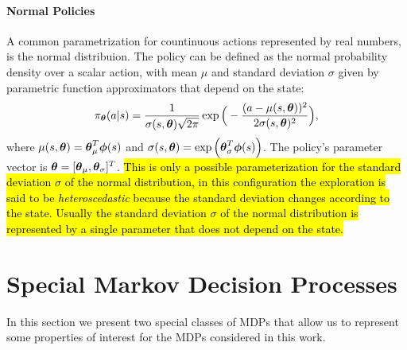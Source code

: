 \paragraph{Normal Policies}
A common parametrization for countinuous actions represented by real numbers, is the normal distribuion. The policy can be defined as the normal probability density over a scalar action, with mean $\mu$ and standard deviation $\sigma$ given by parametric function approximators that depend on the state:
\begin{align} \pi_{\boldsymbol{\theta}}(a|s) = \frac{1}{\sigma(s, \boldsymbol{\theta})\sqrt{2\pi}}\exp\Big( -\frac{(a -\mu(s, \boldsymbol{\theta}))^2}{2\sigma(s, \boldsymbol{\theta})^2}\Big), \end{align}
where $\mu(s, \boldsymbol{\theta}) = \boldsymbol{\theta}_{\mu}^{T} \boldsymbol{\phi}(s)$ and $\sigma(s, \boldsymbol{\theta}) = \exp\Big( \boldsymbol{\theta}_{\sigma}^{T}\boldsymbol{\phi}(s) \Big)$. The policy's parameter vector is $\boldsymbol{\theta} = [\boldsymbol{\theta}_{\mu}, \boldsymbol{\theta}_{\sigma}]^{T}$. \hl{This is only a possible parameterization for the standard deviation $\sigma$ of the normal distribution, in this configuration the exploration is said to be \emph{heteroscedastic} because the standard deviation changes according to the state. Usually the standard deviation $\sigma$ of the normal distribution is represented by a single parameter that does not depend on the state.} 

\section{Special Markov Decision Processes} \label{sec:specmdp}
In this section we present two special classes of \ac{MDPs} that allow us to represent some properties of interest for the \ac{MDPs} considered in this work.

